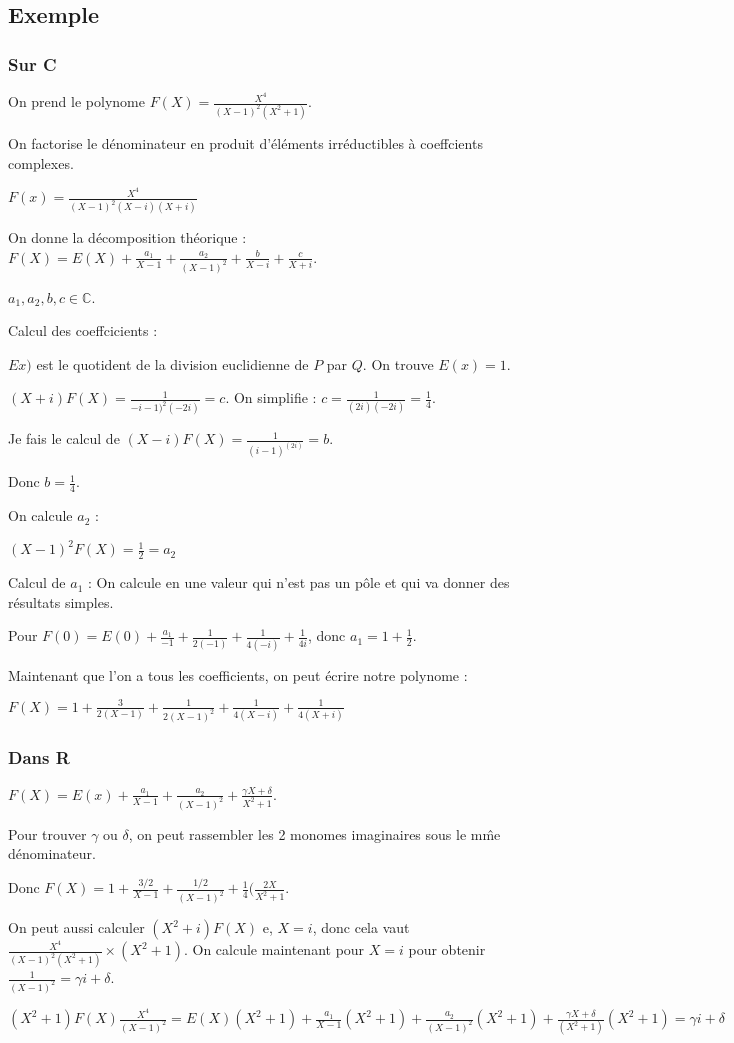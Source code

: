 \documentclass[french]{yLectureNote}
\begin{document}
\subsection{Exemple}
\subsubsection{Sur C}
On prend le polynome $F(X) = \frac{X^4}{(X-1)^2(X^2+1)}$.

On factorise le dénominateur en produit d'éléments irréductibles à coeffcients complexes.

$F(x) = \frac{X^4}{(X-1)^2(X-i)(X+i)}$

On donne la décomposition théorique : $F(X) = E(X) + \frac{a_1}{X-1} + \frac{a_2}{(X-1)^2} + \frac{b}{X-i} + \frac{c}{X+i}$.

$a_1,a_2,b,c \in\mathbb{C}$.

Calcul des coeffcicients :

$Ex)$ est le quotident de la division euclidienne de $P$ par $Q$. On trouve $E(x) =1$.


$(X+i)F(X) = \frac{1}{-i-1)^2(-2i)} = c$. On simplifie : $c= \frac{1}{(2i)(-2i)} = \frac14$.

Je fais le calcul de $(X-i)F(X) = \frac{1}{(i-1)^(2i)} = b$.

Donc $b= \frac14$.

On calcule $a_2$ :

$(X-1)^2F(X) = \frac{1}{2} = a_2$

Calcul de $a_1$ : On calcule en une valeur qui n'est pas un p\^ole et qui va donner des résultats simples.

Pour $F(0) = E(0) + \frac{a_1}{-1} + \frac{1}{2(-1)} + \frac{1}{4(-i)} + \frac{1}{4i}$, donc $a_1 = 1+\frac{1}{2}$.

Maintenant que l'on a tous les coefficients, on peut écrire notre polynome :

$F(X) = 1+\frac{3}{2(X-1)}+\frac{1}{2(X-1)^2}+\frac{1}{4(X-i)}+\frac{1}{4(X+i)}$
\subsubsection{Dans R}
$F(X) = E(x) + \frac{a_1}{X-1}+\frac{a_2}{(X-1)^2}+\frac{\gamma X+\delta}{X^2+1}$.

Pour trouver $\gamma$ ou $\delta$, on peut rassembler les 2 monomes imaginaires sous le m\^me dénominateur.

Donc $F(X) = 1+\frac{3/2}{X-1}+\frac{1/2}{(X-1)^2}+\frac14 (\frac{2X}{X^2+1}$.

On peut aussi calculer $(X^2+i)F(X)$ e, $X=i$, donc cela vaut $\frac{X^4}{(X-1)^2(X^2+1)}\times (X^2+1)$. On calcule maintenant pour $X=i$ pour obtenir $\frac{1}{(X-1)^2} = \gamma i+\delta$.

$(X^2+1)F(X) \frac{X^4}{(X-1)^2} = E(X)(X^2+1) + \frac{a_1}{X-1}(X^2+1)+\frac{a_2}{(X-1)^2}(X^2+1) + \frac{\gamma X + \delta}{(X^2+1)}(X^2+1) = \gamma i + \delta$
\end{document}
